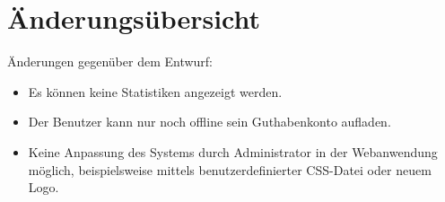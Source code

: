 \chapter*{Änderungsübersicht}
Änderungen gegenüber dem Entwurf:
\begin{itemize}
	\item Es können keine Statistiken angezeigt werden.
	\item Der Benutzer kann nur noch offline sein Guthabenkonto aufladen.
	\item Keine Anpassung des Systems durch Administrator in der Webanwendung möglich, beispielsweise mittels benutzerdefinierter CSS-Datei oder neuem Logo.
\end{itemize} 